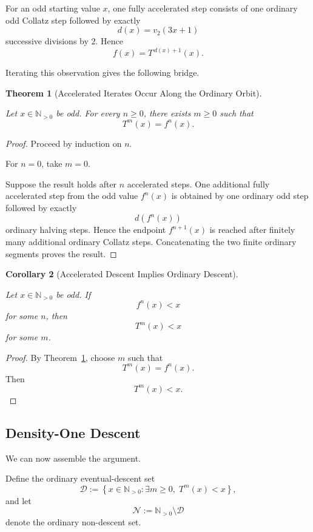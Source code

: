 \documentclass[12pt, oneside]{article}
\numberwithin{equation}{section}
\theoremstyle{definition}
\theoremstyle{plain}
\newtheorem{theorem}{Theorem}[section]
\newtheorem{corollary}[theorem]{Corollary}
\theoremstyle{remark}
\begin{document}
For an odd starting value \(x\), one fully accelerated step consists of one
ordinary odd Collatz step followed by exactly
\[
d(x)=v_2(3x+1)
\]
successive divisions by \(2\). Hence
\[
f(x)
=
T^{\,d(x)+1}(x).
\]

Iterating this observation gives the following bridge.

\begin{theorem}[Accelerated Iterates Occur Along the Ordinary Orbit]
\label{thm:accelerated-to-ordinary-iterate}

Let \(x\in\mathbb N_{>0}\) be odd. For every \(n\ge0\), there exists
\(m\ge0\) such that
\[
\boxed{
T^m(x)=f^n(x).
}
\]
\end{theorem}

\begin{proof}
Proceed by induction on \(n\).

For \(n=0\), take \(m=0\).

Suppose the result holds after \(n\) accelerated steps. One additional
fully accelerated step from the odd value \(f^n(x)\) is obtained by one
ordinary odd step followed by exactly
\[
d\!\left(f^n(x)\right)
\]
ordinary halving steps. Hence the endpoint \(f^{n+1}(x)\) is reached after
finitely many additional ordinary Collatz steps. Concatenating the two
finite ordinary segments proves the result.
\end{proof}

\begin{corollary}[Accelerated Descent Implies Ordinary Descent]
\label{cor:accelerated-implies-ordinary-descent}

Let \(x\in\mathbb N_{>0}\) be odd. If
\[
f^n(x)<x
\]
for some \(n\), then
\[
T^m(x)<x
\]
for some \(m\).
\end{corollary}

\begin{proof}
By Theorem~\ref{thm:accelerated-to-ordinary-iterate}, choose \(m\) such that
\[
T^m(x)=f^n(x).
\]
Then
\[
T^m(x)<x.
\]
\end{proof}

\subsection{Density-One Descent}

We can now assemble the argument.

Define the ordinary eventual-descent set
\[
\mathcal D
:=
\left\{
x\in\mathbb N_{>0}:
\exists m\ge0,\;
T^m(x)<x
\right\},
\]
and let
\[
\mathcal N
:=
\mathbb N_{>0}\setminus\mathcal D
\]
denote the ordinary non-descent set.
\end{document}
